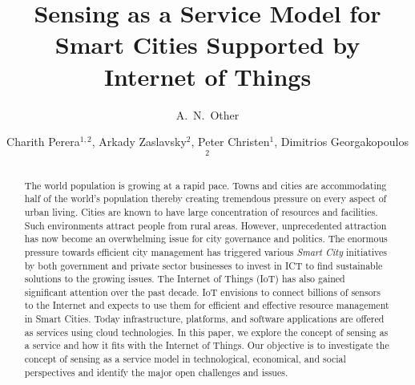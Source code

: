 \documentclass[times]{ettauth}
\begin{document}


\title{Sensing as a Service Model for Smart Cities Supported by Internet of Things}

\author{A.~N.~Other\corrauth}


\author{Charith Perera$^{1,2}$,
 Arkady Zaslavsky$^{2}$,
Peter Christen$^{1}$,
Dimitrios Georgakopoulos$^{2}$}













\address{$^{1}$Research School of Computer Science, The Australian National University, Canberra, ACT 0200, Australia\\
$^{2}$CSIRO ICT Center, Canberra, ACT 2601, Australia}





\begin{abstract}
The world population is growing at a rapid pace. Towns and cities are accommodating half of the world's population thereby creating tremendous pressure on every aspect of urban living. Cities are known to have large concentration of resources and facilities. Such environments attract people from rural areas. However, unprecedented attraction has now become an overwhelming issue for city governance and politics. The enormous pressure towards efficient city management has triggered various \textit{Smart City} initiatives by both government and private sector businesses to invest in ICT to find sustainable solutions to the growing issues. The Internet of Things (IoT) has also gained significant attention over the past decade. IoT envisions to connect billions of sensors to the Internet and expects to use them for efficient and effective resource management in Smart Cities. Today infrastructure, platforms, and software applications are offered as services using cloud technologies. In this paper, we explore the concept of sensing as a service and how it fits with the Internet of Things.  Our objective is to investigate the concept of sensing as a service model in technological, economical, and social perspectives and identify the major open challenges and issues.
\end{abstract}
\end{document}
